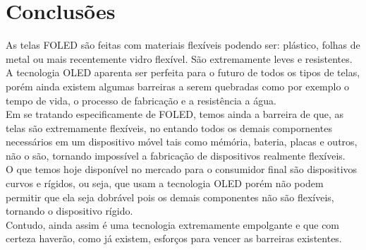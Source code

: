 \chapter{Conclusões}
\label{cap:conclusoes}

As telas FOLED são feitas com materiais flexíveis podendo ser: plástico, folhas de metal ou mais recentemente vidro flexível. São extremamente leves e resistentes. \\

A tecnologia OLED aparenta ser perfeita para o futuro de todos os tipos de telas, porém ainda existem algumas barreiras a serem quebradas como por exemplo o tempo de vida, o processo de fabricação e a resistência a água. \\

Em se tratando especificamente de FOLED, temos ainda a barreira de que, as telas são extremamente flexíveis, no entando todos os demais compornentes necessários em um dispositivo móvel tais como mémória, bateria, placas e outros, não o são, tornando impossível a fabricação de dispositivos realmente flexíveis. \\

O que temos hoje disponível no mercado para o consumidor final são dispositivos curvos e rígidos, ou seja, que usam a tecnologia OLED porém não podem permitir que ela seja dobrável pois os demais componentes não são flexíveis, tornando o dispositivo rígido. \\

Contudo, ainda assim é uma tecnologia extremamente empolgante e que com certeza haverão, como já existem, esforços para vencer as barreiras existentes.


